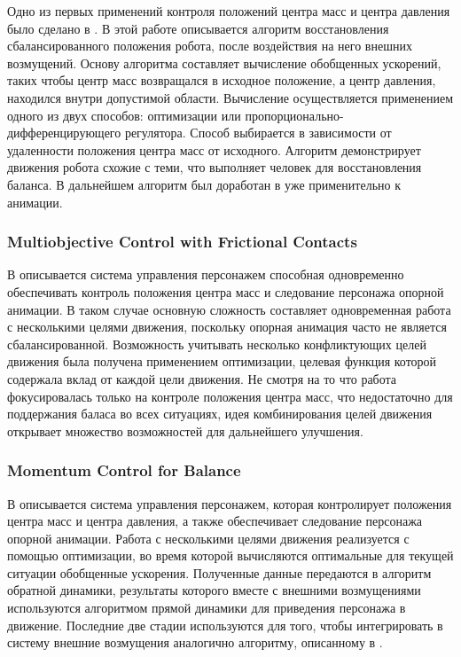 Одно из первых применений контроля положений центра масс и центра давления было сделано в \cite{KudohKI}. В этой работе описывается алгоритм восстановления сбалансированного положения робота, после воздействия на него внешних возмущений. Основу алгоритма составляет вычисление обобщенных ускорений, таких чтобы центр масс возвращался в исходное положение, а центр давления, находился внутри допустимой области. Вычисление осуществляется применением одного из двух способов: оптимизации или пропорционально-дифференцирующего регулятора. Способ выбирается в зависимости от удаленности положения центра масс от исходного. Алгоритм демонстрирует движения робота схожие с теми, что выполняет человек для восстановления баланса. В дальнейшем алгоритм был доработан в \cite{MacchiettoZS} уже применительно к анимации.

\subsubsection{Multiobjective Control with Frictional Contacts}

В \cite{AbeSP} описывается система управления персонажем способная одновременно обеспечивать контроль положения центра масс и следование персонажа опорной анимации. В таком случае основную сложность составляет одновременная работа с несколькими целями движения, поскольку опорная анимация часто не является сбалансированной. Возможность учитывать несколько конфликтующих целей движения была получена применением оптимизации, целевая функция которой содержала вклад от каждой цели движения. Не смотря на то что работа фокусировалась только на контроле положения центра масс, что недостаточно для поддержания баласа во всех ситуациях, идея комбинирования целей движения открывает множество возможностей для дальнейшего улучшения.

\subsubsection{Momentum Control for Balance}

В \cite{MacchiettoZS} описывается система управления персонажем, которая контролирует положения центра масс и центра давления, а также обеспечивает следование персонажа опорной анимации. Работа с несколькими целями движения реализуется с помощью оптимизации, во время которой вычисляются оптимальные для текущей ситуации обобщенные ускорения. Полученные данные передаются в алгоритм обратной динамики, результаты которого вместе с внешними возмущениями используются алгоритмом прямой динамики для приведения персонажа в движение. Последние две стадии используются для того, чтобы интегрировать в систему внешние возмущения аналогично алгоритму, описанному в \cite{KudohKI}.

